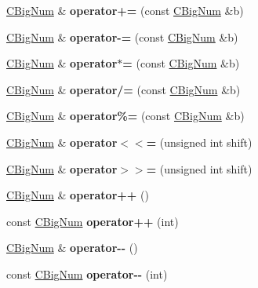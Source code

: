 \begin{DoxyCompactItemize}
\mbox{\hyperlink{class_c_big_num}{C\+Big\+Num}} \& {\bfseries operator+=} (const \mbox{\hyperlink{class_c_big_num}{C\+Big\+Num}} \&b)
\item 
\mbox{\label{class_c_big_num_a4fe724fd22129eefc4e1f34d95505381}} 
\mbox{\hyperlink{class_c_big_num}{C\+Big\+Num}} \& {\bfseries operator-\/=} (const \mbox{\hyperlink{class_c_big_num}{C\+Big\+Num}} \&b)
\item 
\mbox{\label{class_c_big_num_aedd26ffda5c04c4765ba8e18d25d9ff0}} 
\mbox{\hyperlink{class_c_big_num}{C\+Big\+Num}} \& {\bfseries operator$\ast$=} (const \mbox{\hyperlink{class_c_big_num}{C\+Big\+Num}} \&b)
\item 
\mbox{\label{class_c_big_num_a213f7dc5a2d8212d3e7402a06ee5d5b9}} 
\mbox{\hyperlink{class_c_big_num}{C\+Big\+Num}} \& {\bfseries operator/=} (const \mbox{\hyperlink{class_c_big_num}{C\+Big\+Num}} \&b)
\item 
\mbox{\label{class_c_big_num_ac5bec8d967502c15e2dffc8600c933e6}} 
\mbox{\hyperlink{class_c_big_num}{C\+Big\+Num}} \& {\bfseries operator\%=} (const \mbox{\hyperlink{class_c_big_num}{C\+Big\+Num}} \&b)
\item 
\mbox{\label{class_c_big_num_a784951e3a24199fa6b994a951453d156}} 
\mbox{\hyperlink{class_c_big_num}{C\+Big\+Num}} \& {\bfseries operator$<$$<$=} (unsigned int shift)
\item 
\mbox{\label{class_c_big_num_a7d2759e104a02502891b185dfb704ad1}} 
\mbox{\hyperlink{class_c_big_num}{C\+Big\+Num}} \& {\bfseries operator$>$$>$=} (unsigned int shift)
\item 
\mbox{\label{class_c_big_num_ac9421f22614796d8520be7e6ade71ee8}} 
\mbox{\hyperlink{class_c_big_num}{C\+Big\+Num}} \& {\bfseries operator++} ()
\item 
\mbox{\label{class_c_big_num_aa69e12c7f330374b2d86df0da0627e58}} 
const \mbox{\hyperlink{class_c_big_num}{C\+Big\+Num}} {\bfseries operator++} (int)
\item 
\mbox{\label{class_c_big_num_a47920287946fb3a55e84af70e953e78f}} 
\mbox{\hyperlink{class_c_big_num}{C\+Big\+Num}} \& {\bfseries operator-\/-\/} ()
\item 
\mbox{\label{class_c_big_num_a13d365561d5407fc624eacb6378db4d3}} 
const \mbox{\hyperlink{class_c_big_num}{C\+Big\+Num}} {\bfseries operator-\/-\/} (int)
\end{DoxyCompactItemize}
